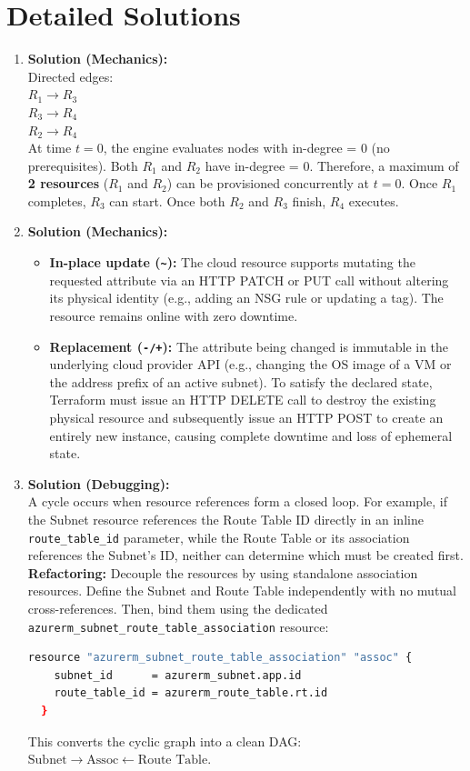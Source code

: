 \section{Detailed Solutions}
\begin{enumerate}[leftmargin=18pt]
  \item \textbf{Solution (Mechanics):}\\
  Directed edges:\\
  $R_1 \longrightarrow R_3$\\
  $R_3 \longrightarrow R_4$\\
  $R_2 \longrightarrow R_4$\\
  At time $t=0$, the engine evaluates nodes with in-degree = 0 (no prerequisites). Both $R_1$ and $R_2$ have in-degree = 0. Therefore, a maximum of \textbf{2 resources} ($R_1$ and $R_2$) can be provisioned concurrently at $t=0$. Once $R_1$ completes, $R_3$ can start. Once both $R_2$ and $R_3$ finish, $R_4$ executes.

  \item \textbf{Solution (Mechanics):}\\
  \begin{itemize}[leftmargin=12pt]
    \item \textbf{In-place update (\texttt{\textasciitilde{}}):} The cloud resource supports mutating the requested attribute via an HTTP PATCH or PUT call without altering its physical identity (e.g., adding an NSG rule or updating a tag). The resource remains online with zero downtime.
    \item \textbf{Replacement (\texttt{-/+}):} The attribute being changed is immutable in the underlying cloud provider API (e.g., changing the OS image of a VM or the address prefix of an active subnet). To satisfy the declared state, Terraform must issue an HTTP DELETE call to destroy the existing physical resource and subsequently issue an HTTP POST to create an entirely new instance, causing complete downtime and loss of ephemeral state.
  \end{itemize}

  \item \textbf{Solution (Debugging):}\\
  A cycle occurs when resource references form a closed loop. For example, if the Subnet resource references the Route Table ID directly in an inline \texttt{route\_table\_id} parameter, while the Route Table or its association references the Subnet's ID, neither can determine which must be created first.\\
  \textbf{Refactoring:} Decouple the resources by using standalone association resources. Define the Subnet and Route Table independently with no mutual cross-references. Then, bind them using the dedicated \texttt{azurerm\_subnet\_route\_table\_association} resource:
  \begin{lstlisting}[language=bash]
  resource "azurerm_subnet_route_table_association" "assoc" {
    subnet_id      = azurerm_subnet.app.id
    route_table_id = azurerm_route_table.rt.id
  }
  \end{lstlisting}
  This converts the cyclic graph into a clean DAG: $\text{Subnet} \to \text{Assoc} \leftarrow \text{Route Table}$.


\end{enumerate}
